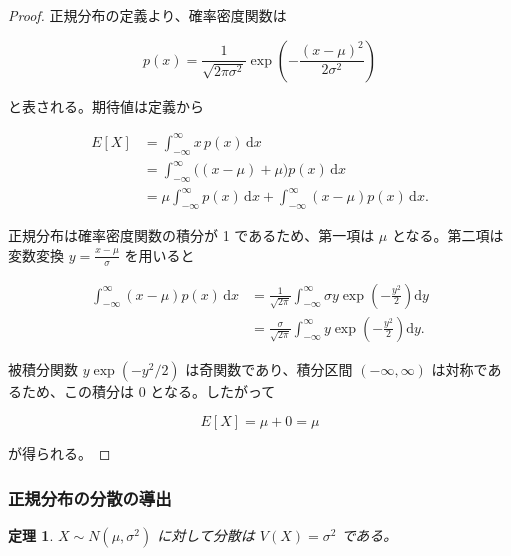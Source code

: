 \documentclass[
  11pt,
  a4paper,
]{extarticle}
\numberwithin{equation}{section}
\theoremstyle{plain}
\newtheorem*{thm*}{定理}
\theoremstyle{definition}
\begin{document}
\begin{proof}
正規分布の定義より、確率密度関数は

$$
p(x) = \frac{1}{\sqrt{2\pi \sigma^2}} \exp\left(-\frac{(x-\mu)^2}{2\sigma^2}\right)
$$

と表される。期待値は定義から

\begin{align*}
E[X]
&= \int_{-\infty}^{\infty} x \, p(x) \, \mathrm{d}x \\
&= \int_{-\infty}^{\infty} \bigl((x-\mu) + \mu\bigr) p(x) \, \mathrm{d}x \\
&= \mu \int_{-\infty}^{\infty} p(x) \, \mathrm{d}x + \int_{-\infty}^{\infty} (x-\mu) p(x) \, \mathrm{d}x.
\end{align*}

正規分布は確率密度関数の積分が 1 であるため、第一項は $\mu$ となる。第二項は変数変換 $y = \frac{x-\mu}{\sigma}$ を用いると

\begin{align*}
\int_{-\infty}^{\infty} (x-\mu) p(x) \, \mathrm{d}x
&= \frac{1}{\sqrt{2\pi}} \int_{-\infty}^{\infty} \sigma y \exp\left(-\frac{y^2}{2}\right) \mathrm{d}y \\
&= \frac{\sigma}{\sqrt{2\pi}} \int_{-\infty}^{\infty} y \exp\left(-\frac{y^2}{2}\right) \mathrm{d}y.
\end{align*}

被積分関数 $y \exp(-y^2/2)$ は奇関数であり、積分区間 $(-\infty, \infty)$ は対称であるため、この積分は 0 となる。したがって

$$
E[X] = \mu + 0 = \mu
$$

が得られる。
\end{proof}

\newpage

\subsubsection{正規分布の分散の導出}\label{ux6b63ux898fux5206ux5e03ux306eux5206ux6563ux306eux5c0eux51fa}

\begin{thm*}

$X \sim N(\mu, \sigma^2)$ に対して分散は $V(X) = \sigma^2$ である。

\end{thm*}
\end{document}
